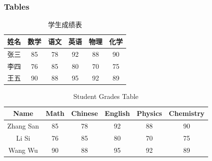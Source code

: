 \documentclass{cls/simplebeamer}
\begin{document}
\begin{frame}
  \frametitle{Tables}
  \begin{table}
    \centering
    \caption{学生成绩表}
    \begin{tabular}{|c|c|c|c|c|c|}
        \hline
        \textbf{姓名} & \textbf{数学} & \textbf{语文} & \textbf{英语} & \textbf{物理} & \textbf{化学} \\
        \hline
        张三 & 85 & 78 & 92 & 88 & 90 \\
        \hline
        李四 & 76 & 85 & 80 & 70 & 75 \\
        \hline
        王五 & 90 & 88 & 95 & 92 & 89 \\
        \hline
    \end{tabular}
\end{table}

\begin{table}[h]
  \centering
  \caption{Student Grades Table}
  \begin{tabular}{|c|c|c|c|c|c|}
      \hline
      \textbf{Name} & \textbf{Math} & \textbf{Chinese} & \textbf{English} & \textbf{Physics} & \textbf{Chemistry} \\
      \hline
      Zhang San & 85 & 78 & 92 & 88 & 90 \\
      \hline
      Li Si & 76 & 85 & 80 & 70 & 75 \\
      \hline
      Wang Wu & 90 & 88 & 95 & 92 & 89 \\
      \hline
  \end{tabular}
\end{table}
\end{frame}
\end{document}
